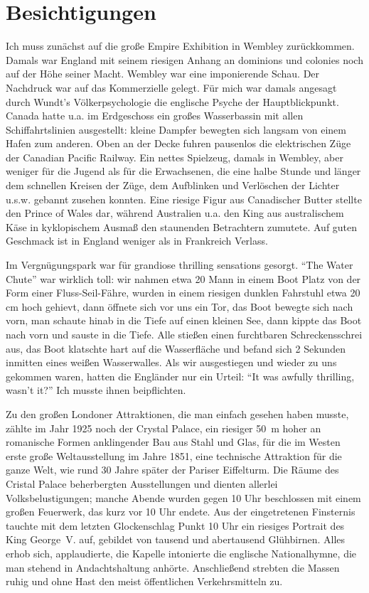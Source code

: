 \section{Besichtigungen}
Ich muss zunächst auf die große Empire Exhibition in Wembley zurückkommen. Damals war England mit seinem riesigen Anhang an dominions und colonies noch auf der Höhe seiner Macht. Wembley war eine imponierende Schau. Der Nachdruck war auf das Kommerzielle gelegt. Für mich war damals angesagt durch Wundt's Völkerpsychologie die englische Psyche der Hauptblickpunkt. Canada hatte u.a. im Erdgeschoss ein großes Wasserbassin mit allen Schiffahrtslinien ausgestellt: kleine Dampfer bewegten sich langsam von einem Hafen zum anderen. Oben an der Decke fuhren pausenlos die elektrischen Züge der Canadian Pacific Railway. Ein nettes Spielzeug, damals in Wembley, aber weniger für die Jugend als für die Erwachsenen, die eine halbe Stunde und länger dem schnellen Kreisen der Züge, dem Aufblinken und Verlöschen der Lichter u.s.w. gebannt zusehen konnten. Eine riesige Figur aus Canadischer Butter stellte den Prince of Wales dar, während Australien u.a. den King aus australischem Käse in kyklopischem Ausmaß den staunenden Betrachtern zumutete. Auf guten Geschmack ist in England weniger als in Frankreich Verlass.

Im Vergnügungspark war für grandiose thrilling sensations gesorgt. \enquote{The Water Chute} war wirklich toll: wir nahmen etwa 20 Mann in einem Boot Platz von der Form einer Fluss-Seil-Fähre, wurden in einem riesigen dunklen Fahrstuhl etwa 20 cm hoch gehievt, dann öffnete sich vor uns ein Tor, das Boot bewegte sich nach vorn, man schaute hinab in die Tiefe auf einen kleinen See, dann kippte das Boot nach vorn und sauste in die Tiefe. Alle stießen einen furchtbaren Schreckensschrei aus, das Boot klatschte hart auf die Wasserfläche und befand sich 2 Sekunden inmitten eines weißen Wasserwalles. Als wir ausgestiegen und wieder zu uns gekommen waren, hatten die Engländer nur ein Urteil: \enquote{It was awfully thrilling, wasn't it?} Ich musste ihnen beipflichten.

Zu den großen Londoner Attraktionen, die man einfach gesehen haben musste, zählte im Jahr 1925 noch der Crystal Palace, ein riesiger 50~m hoher an romanische Formen anklingender Bau aus Stahl und Glas, für die im Westen erste große Weltausstellung im Jahre 1851, eine technische Attraktion für die ganze Welt, wie rund 30 Jahre später der Pariser Eiffelturm. Die Räume des Cristal Palace beherbergten Ausstellungen und dienten allerlei Volksbelustigungen; manche Abende wurden gegen 10 Uhr beschlossen mit einem großen Feuerwerk, das kurz vor 10 Uhr endete. Aus der eingetretenen Finsternis tauchte mit dem letzten Glockenschlag Punkt 10 Uhr ein riesiges Portrait des King George~V. auf, gebildet von tausend und abertausend Glühbirnen. Alles erhob sich, applaudierte, die Kapelle intonierte die englische Nationalhymne, die man stehend in Andachtshaltung anhörte. Anschließend strebten die Massen ruhig und ohne Hast den meist öffentlichen Verkehrsmitteln zu.

